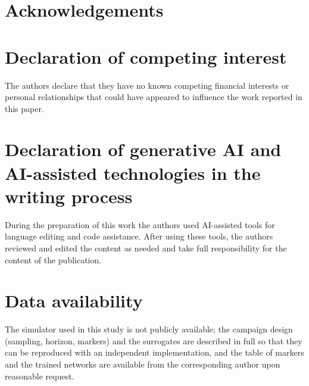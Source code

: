 \documentclass[a4paper,fleqn]{cas-sc}
\begin{document}
\section*{Acknowledgements}

\section*{Declaration of competing interest}
The authors declare that they have no known competing financial interests or personal relationships that could have appeared to influence the work reported in this paper.

\section*{Declaration of generative AI and AI-assisted technologies in the writing process}
During the preparation of this work the authors used AI-assisted tools for language editing and code assistance. After using these tools, the authors reviewed and edited the content as needed and take full responsibility for the content of the publication.

\section*{Data availability}
The simulator used in this study is not publicly available; the campaign design (sampling, horizon, markers) and the surrogates are described in full so that they can be reproduced with an independent implementation, and the table of markers and the trained networks are available from the corresponding author upon reasonable request.

\printcredits



\end{document}
